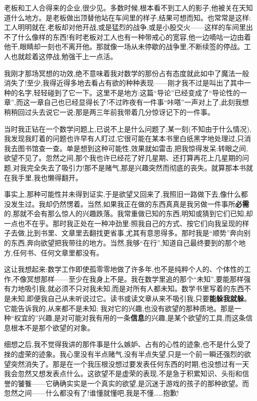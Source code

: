 老板和工人合得来的企业,很少见。多数时候,根本看不到工人的影子,他被关在天知道什么地方。是老板做出顶替他站在车间里的样子,结果可想而知。也常常是这样:工人明明就在,老板却对他开战,或是猛烈的战争,或是小股交火——这样的车间里出不了什么像样的东西!有时老板对工人也有一种带戒心的宽容,他一边嘀咕一边由着他干,眼睛却一刻也不离开他。那就像一场从未停歇的战争里,不断续签的停战。工人也就趁着这停战,勉强干上一点活。

我刚才那场冥想的功效,绝不意味着我对数学的那份占有态度就此如中了魔法一般消失了!至少,我得近得多地去看占有欲的种种表现——刚才我不过是叫出了其中一种的名字,轻轻碰到了它一下。这里不是地方:这篇“导论”已经变成了“导论性的一章”,而这一章自己也已经显得长了!不过昨夜有一件事“咔嗒”一声对上了,此刻我想稍稍回过头去说它一说;那是两三年前我带着几分惊讶记下的一件事。

当时我正钻在一个数学问题上,已说不上是什么问题了;某一刻(不知由于什么情况),我发现我盯着的问题也许早有人盯过,它很可能在某本书里白纸黑字地处理过,只消我去图书馆查一查。单是想到这种可能性,效果就如雷击,把我惊得发呆:转眼之间,欲望不见了。忽然之间,那个我也许已经花了好几星期、还打算再花上几星期的问题,对我完全失去了吸引力!那不是赌气,那是兴趣突然而彻底的丧失。就算那本书就在我手里,我也懒得翻开。

 事实上,那种可能性并未得到证实,于是欲望又回来了,我照旧一路做下去,像什么都没发生过。我却仍然愣着。当然,如果我正在做的东西真真是我另做一件事所\textbf{必需}的,那就不会有那么惊人的兴趣跌落。我常重做已知的东西,明知或猜到它们已知,却一点也不在乎。那时我正处在一种冲劲里:照我自己的方式、按它们向我呈现的样子去做,比到书里、文章里去翻找更省事,尤其有意思得多。那时我是“顺势”奔向别的东西,奔向欲望把我带往的地方。当然,我够“在行”,知道自己最终要到的那个地方,任何书、任何文章里都没有。

这让我想起来:数学工作即使孤零零地做了许多年,也不是纯粹个人的、个体性的工作,不像冥想那样——至少在我身上不是。我在数学里追的那个“未知”,要能那样强有力地吸引我,就必须不只对我未知,而是对所有人都未知。数学书里写着的东西不是未知,即便我自己从未听说过它。读书或读文章从来不吸引我,只要\textbf{能躲我就躲}。它能告诉我的,从来都不是未知;
我对它的兴趣,也没有欲望的那种质地。那是一种“权宜的”兴趣,是对可能对我有用的一条\textbf{信息}的兴趣,是某个欲望的工具,而这条信息根本不是那个欲望的对象。

细想之后,我不觉得我讲的那件事是什么嫉妒、占有的心性的迹象,也不是什么受了挫的虚荣的迹象。我心里没有半点赌气,没有半点失望,只是一个前一瞬还强烈的欲望突然消失了。那是在一个我压根没想过要发表任何东西的时期,也没想过有一天我会忽然又想发表点什么。这欲望不是虚荣的表现,不是急于积累知识、头衔和信誉的饕餮——它确确实实是一个真实的欲望,是沉迷于游戏的孩子的那种欲望。而忽然之间——什么都没有了!谁懂就懂吧,我是不懂……抱歉!

